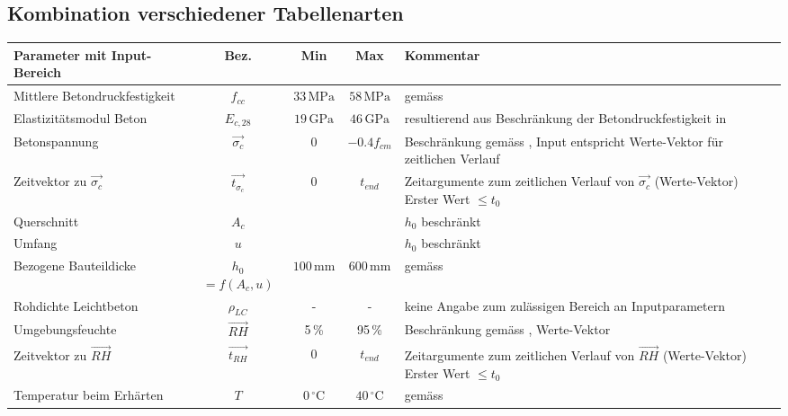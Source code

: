 \subsection{Kombination verschiedener Tabellenarten}%
%
%
\begin{table}[H]
\begin{center}
\begin{tabularx}{150mm}{ l c c c X }
\hline 
\textbf{Parameter mit Input-Bereich} & \textbf{Bez.} & \textbf{Min} & \textbf{Max} & \textbf{Kommentar} \\
\hline 
Mittlere Betondruckfestigkeit & $f_{cc}$ & $33\,\textrm{MPa}$ & $58\,\textrm{MPa}$ & gemäss \cite{siadoku0192,eurocode2}  \\ 
Elastizitätsmodul Beton & $E_{c,28}$ & $19\,\textrm{GPa}$ & $46\,\textrm{GPa}$ & resultierend aus Beschränkung der Betondruckfestigkeit in \newline \cite{siadoku0192,eurocode2}\\ 
Betonspannung& $\vec{\sigma_{c}}$ & $0$ & $-0.4f_{cm}$ & Beschränkung gemäss \cite{siadoku0192}, \newline Input entspricht Werte-Vektor für zeitlichen Verlauf  \\ 
Zeitvektor zu $\vec{\sigma_{c}}$ & $\vec{t_{\sigma_{c}}}$ & 0 & $t_{end}$ & Zeitargumente zum zeitlichen Verlauf von $\vec{\sigma_{c}}$ (Werte-Vektor) \newline Erster Wert $\le t_0$ \\
Querschnitt & $A_{c}$ &  &  & $h_0$ beschränkt \\ 
Umfang & $u$ & &  & $h_0$ beschränkt \\ 
Bezogene Bauteildicke & $h_0$ \footnotesize{$=f(A_c,u)$} & $100\,\textrm{mm}$ & $600\,\textrm{mm}$ & gemäss \cite{siadoku0192,eurocode2} \\  
Rohdichte Leichtbeton& $\rho_{LC}$ & - & - & keine Angabe zum zulässigen \newline  Bereich an Inputparametern  \\ 
Umgebungsfeuchte & $\vec{RH}$ & 5\,\% & 95\,\% & Beschränkung gemäss \cite{siadoku0192,eurocode2}, \newline Werte-Vektor \\ 
Zeitvektor zu $\vec{RH}$ & $\vec{t_{RH}}$ & 0 & $t_{end}$ & Zeitargumente zum zeitlichen Verlauf von $\vec{RH}$ (Werte-Vektor) \newline Erster Wert $\le t_0$ \\
Temperatur beim Erhärten & $T$ & $0\,^{\circ}\mathrm{C}$ & $40\,^{\circ}\mathrm{C}$ & gemäss \cite{siadoku0192,eurocode2}  \\

\end{tabularx}
\end{center}
\end{table}

